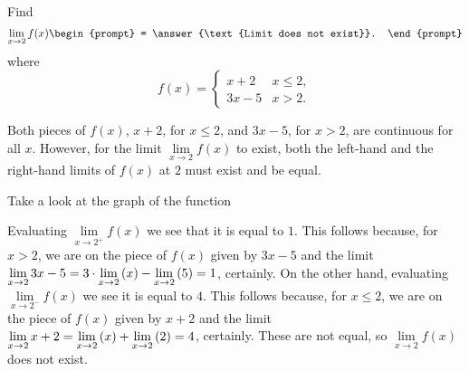 \documentclass{ximera}
\author{Gregory Hartman \and Matthew Carr}
\begin{document}
\begin{exercise}



  Find 
  \[
  \displaystyle \lim_{x\to 2} f(x)
  \begin{prompt}
  = \answer{\text{Limit does not exist}}.
  \end{prompt}
  \]
  where
  \[
  f(x) = \left\{\begin{array}{cl} x+2 & x\leq 2, \\ 3x-5 & x>2. \end{array}\right.
  \]
    \begin{hint}
     Both pieces of $f(x)$, $x+2$, for $x\le2$, and $3x-5$, for $x>2$, are continuous for all $x$. However, for the limit $\lim\limits_{x\to2}f(x)$ to exist, both the left-hand and the right-hand limits of $f(x)$ at $2$ must exist and be equal.
    \end{hint}
     \begin{hint}
    	Take a look at the graph of the function
    \begin{center}
      \end{center} 
    \end{hint}
    \begin{hint}
     Evaluating $\lim\limits_{x\to2^{+}}f(x)$ we see that it is equal to $1$. This follows because, for $x>2$, we are on the piece of $f(x)$ given by $3x-5$ and the limit $\lim\limits_{x\to2}3x-5=3\cdot\lim\limits_{x\to 2}\p{x}-\lim\limits_{x\to2}\p{5}=1$, certainly. On the other hand, evaluating $\lim\limits_{x\to2^{-}}f(x)$ we see it is equal to $4$. This follows because, for $x\le2$, we are on the piece of $f(x)$ given by $x+2$ and the limit $\lim\limits_{x\to2}x+2=\lim\limits_{x\to2}\p{x}+\lim\limits_{x\to2}\p{2}=4$, certainly. These are not equal, so $\lim\limits_{x\to 2}f(x)$ does not exist.
    \end{hint} 
\end{exercise}
\end{document}
